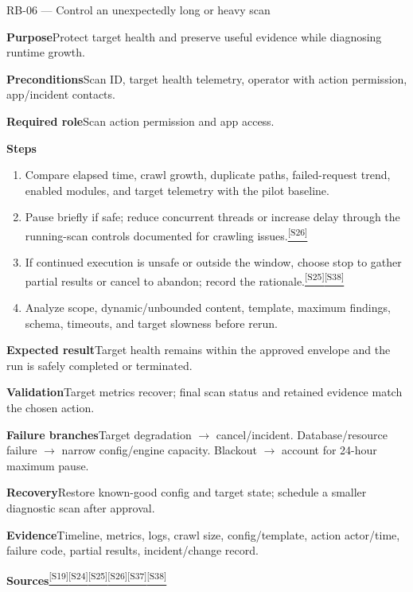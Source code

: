 \documentclass[11pt,letterpaper,oneside]{scrreprt}
\newcommand{\src}[1]{\hyperref[src:#1]{\textsuperscript{\color{R7Orange}[#1]}}}
\newcommand{\field}[1]{\par\smallskip\noindent\textbf{#1}\quad}
\begin{document}
\begin{procedure}{RB-06 --- Control an unexpectedly long or heavy scan}
\field{Purpose}Protect target health and preserve useful evidence while diagnosing runtime growth.
\field{Preconditions}Scan ID, target health telemetry, operator with action permission, app/incident contacts.
\field{Required role}Scan action permission and app access.
\field{Steps}
\begin{enumerate}
  \item Compare elapsed time, crawl growth, duplicate paths, failed-request trend, enabled modules, and target telemetry with the pilot baseline.
  \item Pause briefly if safe; reduce concurrent threads or increase delay through the running-scan controls documented for crawling issues.\src{S26}
  \item If continued execution is unsafe or outside the window, choose stop to gather partial results or cancel to abandon; record the rationale.\src{S25}\src{S38}
  \item Analyze scope, dynamic/unbounded content, template, maximum findings, schema, timeouts, and target slowness before rerun.
\end{enumerate}
\field{Expected result}Target health remains within the approved envelope and the run is safely completed or terminated.
\field{Validation}Target metrics recover; final scan status and retained evidence match the chosen action.
\field{Failure branches}Target degradation $\rightarrow$ cancel/incident. Database/resource failure $\rightarrow$ narrow config/engine capacity. Blackout $\rightarrow$ account for 24-hour maximum pause.
\field{Recovery}Restore known-good config and target state; schedule a smaller diagnostic scan after approval.
\field{Evidence}Timeline, metrics, logs, crawl size, config/template, action actor/time, failure code, partial results, incident/change record.
\field{Sources}\src{S19}\src{S24}\src{S25}\src{S26}\src{S37}\src{S38}
\end{procedure}
\end{document}

